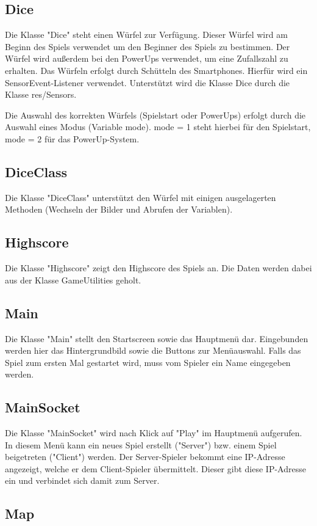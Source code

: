 \documentclass[11pt]{article} %
\begin{document}
\subsection{Dice}
Die Klasse "Dice" steht einen Würfel zur Verfügung. Dieser Würfel wird am Beginn des Spiels verwendet um den Beginner des Spiels zu bestimmen. Der Würfel wird außerdem bei den PowerUps verwendet, um eine Zufallszahl zu erhalten.
Das Würfeln erfolgt durch Schütteln des Smartphones. Hierfür wird ein SensorEvent-Listener verwendet. Unterstützt wird die Klasse Dice durch die Klasse res/Sensors.

Die Auswahl des korrekten Würfels (Spielstart oder PowerUps) erfolgt durch die Auswahl eines Modus (Variable mode). mode = 1 steht hierbei für den Spielstart, mode = 2 für das PowerUp-System.

\subsection{DiceClass}
Die Klasse "DiceClass" unterstützt den Würfel mit einigen ausgelagerten Methoden (Wechseln der Bilder und Abrufen der Variablen).

\subsection{Highscore}
Die Klasse "Highscore" zeigt den Highscore des Spiels an. Die Daten werden dabei aus der Klasse GameUtilities geholt.

\subsection{Main}
Die Klasse "Main" stellt den Startscreen sowie das Hauptmenü dar. Eingebunden werden hier das Hintergrundbild sowie die Buttons zur Menüauswahl. Falls das Spiel zum ersten Mal gestartet wird, muss vom Spieler ein Name eingegeben werden.

\subsection{MainSocket}
Die Klasse "MainSocket" wird nach Klick auf "Play" im Hauptmenü aufgerufen. In diesem Menü kann ein neues Spiel erstellt ("Server") bzw. einem Spiel beigetreten ("Client") werden.
Der Server-Spieler bekommt eine IP-Adresse angezeigt, welche er dem Client-Spieler übermittelt. Dieser gibt diese IP-Adresse ein und verbindet sich damit zum Server.

\subsection{Map}
\end{document}
